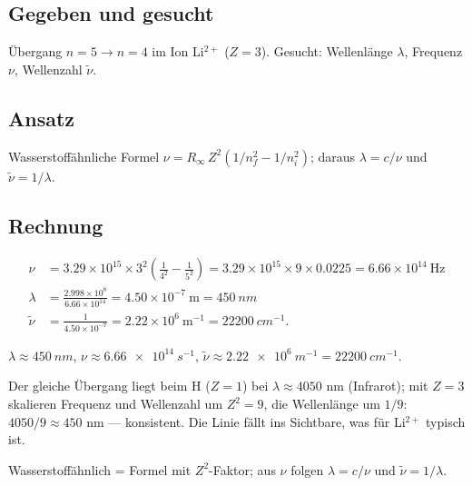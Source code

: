 
\subsection*{Gegeben und gesucht}
Übergang $n = 5 \rightarrow n = 4$ im Ion Li$^{2+}$ ($Z=3$). Gesucht:
Wellenlänge $\lambda$, Frequenz $\nu$, Wellenzahl $\tilde\nu$.

\subsection*{Ansatz}
Wasserstoffähnliche Formel $\nu = R_\infty\,Z^2(1/n_f^2 - 1/n_i^2)$; daraus
$\lambda = c/\nu$ und $\tilde\nu = 1/\lambda$.

\subsection*{Rechnung}
\begin{align*}
  \nu &= 3.29\times10^{15}\times 3^2
       \left(\frac{1}{4^2} - \frac{1}{5^2}\right)
  = 3.29\times10^{15}\times 9 \times 0.0225
  = 6.66\times10^{14}\ \mathrm{Hz} \\[2pt]
  \lambda &= \frac{2.998\times10^{8}}{6.66\times10^{14}}
  = 4.50\times10^{-7}\ \mathrm{m}
  = \qty{450}{nm} \\[2pt]
  \tilde\nu &= \frac{1}{4.50\times10^{-7}}
  = 2.22\times10^{6}\ \mathrm{m^{-1}}
  = \qty{22200}{cm^{-1}}.
\end{align*}

\begin{ergebnis}
$\lambda \approx \qty{450}{nm}$,\quad
$\nu \approx \qty{6.66e14}{s^{-1}}$,\quad
$\tilde\nu \approx \qty{2.22e6}{m^{-1}} = \qty{22200}{cm^{-1}}$.
\end{ergebnis}

\begin{kontrolle}
Der gleiche Übergang liegt beim H ($Z=1$) bei $\lambda \approx 4050$ nm
(Infrarot); mit $Z=3$ skalieren Frequenz und Wellenzahl um $Z^2=9$, die
Wellenlänge um $1/9$: $4050/9 \approx 450$ nm --- konsistent. Die Linie fällt
ins Sichtbare, was für Li$^{2+}$ typisch ist.
\end{kontrolle}

\begin{merksatz}
Wasserstoffähnlich = Formel mit $Z^2$-Faktor; aus $\nu$ folgen
$\lambda = c/\nu$ und $\tilde\nu = 1/\lambda$.
\end{merksatz}
